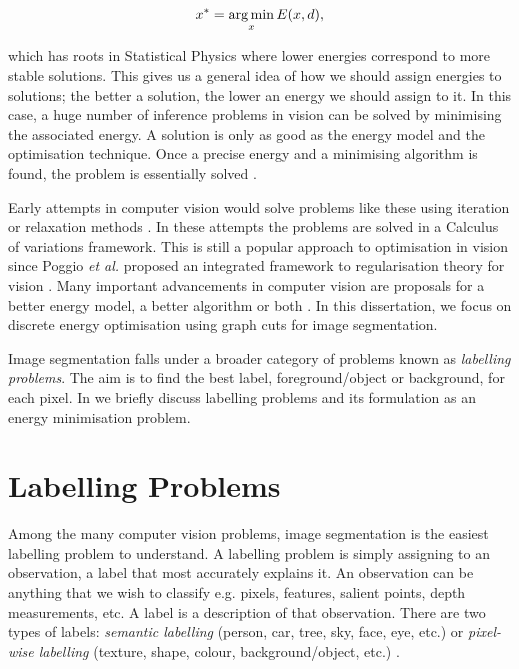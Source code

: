 \begin{equation}
	x^{*} = \operatorname*{arg\,min}_{x}E(x,d),
	\label{eq:gibbsenergy}
\end{equation}

which has roots in Statistical Physics where lower energies correspond to more stable solutions.
This gives us a general idea of how we should assign energies to solutions; the better a solution, the lower an energy we should assign to it.
In this case, a huge number of inference problems in vision can be solved by minimising the associated energy.
A solution is only as good as the energy model and the optimisation technique. Once a precise energy and a minimising algorithm is found, the problem is essentially solved \citep{Delong2011}. 

Early attempts in computer vision would solve problems like these using iteration or relaxation methods \citep{Waltz1975,Rosenfeld1976}.
In these attempts the problems are solved in a Calculus of variations framework. This is still a popular approach to optimisation in vision since Poggio \textit{et al.} \citep{Poggio1985} proposed an integrated framework to regularisation theory for vision \citep{Sakaue1999}.
Many important advancements in computer vision are proposals for a better energy model, a better algorithm or both \citep{Delong2011,Boykov2001,Kolmogorov2005,Mumford1989,Shi1997}.
In this dissertation, we focus on discrete energy optimisation using graph cuts for image segmentation.

Image segmentation falls under a broader category of problems known as \textit{labelling problems}.
The aim is to find the best label, foreground/object or background, for each pixel.
In  we briefly discuss labelling problems and its formulation as an energy minimisation problem.


\section{Labelling Problems}
\label{sec:LabellingProblems}

Among the many computer vision problems, image segmentation is the easiest labelling problem to understand.
A labelling problem is simply assigning to an observation, a label that most accurately explains it.
An observation can be anything that we wish to classify e.g. pixels, features, salient points, depth measurements, etc.
A label is a description of that observation.
There are two types of labels: \textit{semantic labelling} (person, car, tree, sky, face, eye, etc.) or \textit{pixel-wise labelling} (texture, shape, colour, background/object, etc.) \citep{Delong2011,Athanasiadis2007}.

